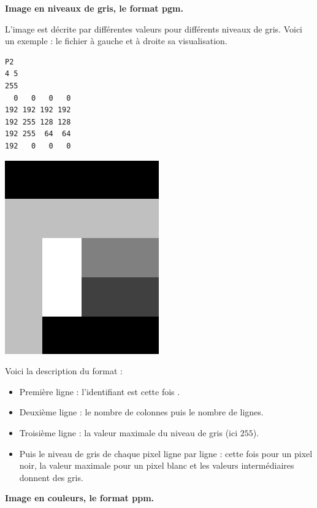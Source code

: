 \documentclass[11pt,class=report,crop=false]{standalone}
\begin{document}
\begin{cours}
\medskip

\textbf{Image en niveaux de gris, le format \og{}pgm\fg{}.}

L'image est décrite par différentes valeurs pour différents niveaux de gris.
Voici un exemple : le fichier  à gauche et à droite sa visualisation.
\begin{center}
\begin{minipage}{0.3\textwidth}
\begin{lstlisting}
P2
4 5
255
  0   0   0   0
192 192 192 192
192 255 128 128
192 255  64  64
192   0   0   0
\end{lstlisting}
\end{minipage}
\begin{minipage}{0.3\textwidth}
\includegraphics[scale=0.2]{ecran-cours-image_gris}
\end{minipage}
\end{center}

Voici la description du format :
\begin{itemize}
  \item Première ligne : l'identifiant est cette fois .
  \item Deuxième ligne : le nombre de colonnes puis le nombre de lignes.
  \item Troisième ligne : la valeur maximale du niveau de gris (ici $255$).
  \item Puis le niveau de gris de chaque pixel ligne par ligne : cette fois  pour un pixel noir, la valeur maximale pour un pixel blanc et les valeurs intermédiaires donnent des gris. 
\end{itemize}  

\medskip

\textbf{Image en couleurs, le format \og{}ppm\fg{}.}



\end{cours}
\end{document}
